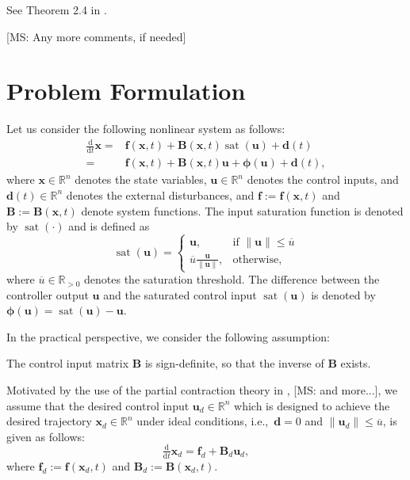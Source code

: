 \documentclass{ifacconf}
\newcommand{\MSRY}[1]{{\color{Peach} [MS: #1]}} %
\newcommand\ie{\textrm{i.e.,\ }}
\newcommand{\ctxt}[2]{{\color{#1}{#2}\color{black}}}
\newcommand{\cred}[1]{{\ctxt{awesome}{#1}}}
\newcommand\R{\mathbb{R}}
\newcommand*{\mv}[1]{\boldsymbol{#1}} %
\newcommand*{\mm}[1]{\boldsymbol{#1}} %
\newcommand*{\norm}[1]{\lVert #1 \rVert} %
\DeclareMathOperator{\mysat}{{sat}}       %
\newcommand\der{\mathrm d}
\newcommand*{\ddtt}{
   \tfrac{\der}{\der t}
}
\begin{document}
\begin{pf}
   See Theorem 2.4 in \cite{Tsukamoto:2021aa}.
\end{pf}


\MSRY{Any more comments, if needed}

\section{Problem Formulation}

Let us consider the following nonlinear system as follows:
\begin{equation} \label{eq:sys}
   \begin{aligned}   
      \ddtt{\mv{x}}
      =&
      \mv{f}(\mv{x},t)
      +
      \mm{B}(\mv{x},t)
      \mysat(\mv{u})   
      +
      \mv{d}(t)
      \\
      =&
      \mv{f}(\mv{x},t)
      +
      \mm{B}(\mv{x},t)
      \mv{u}
      +
      \mv{\phi(\mv{u})}
      +
      \mv{d}(t)
      ,
   \end{aligned}
\end{equation}
where $\mv{x}\in\R^n$ denotes the state variables, $\mv{u}\in\R^n$ denotes the control inputs, and $\mv{d}(t)\in\R^n$ denotes the external disturbances, and $\mv{f}:=\mv{f}(\mv{x},t)$ and $\mm{B}:=\mm{B}(\mv{x},t)$ denote system functions.
The input saturation function is denoted by $\mysat(\cdot)$ and is defined as
\begin{equation} \label{eq:sys:sat}
   \mysat(\mv{u}) =
   \begin{cases}
      \mv{u}, & \text{if } \norm{\mv{u}} \le \overline{u} \\
      \overline{u}\tfrac{\mv{u}}{\norm{\mv{u}}}, & \text{otherwise}
      ,
   \end{cases}
\end{equation}
where $\overline{u}\in\R_{>0}$ denotes the saturation threshold.
The difference between the controller output $\mv{u}$ and the saturated control input $\mysat(\mv{u})$ is denoted by $\mv{\phi}(\mv{u}) = \mysat(\mv{u}) - \mv{u}$.

In the practical perspective, we consider the following assumption:
\begin{assum}
   \cred{수도인버스로변경}The control input matrix $\mv{B}$ is sign-definite, so that the inverse of $\mm{B}$ exists.
\end{assum}

Motivated by the use of the partial contraction theory in \cite{Tsukamoto:2021af}, \MSRY{and more...}, we assume that the desired control input $\mv{u}_d\in\R^n$ which is designed to achieve the desired trajectory $\mv{x}_d\in\R^n$ under ideal conditions, \ie $\mv{d}=0$ and $\norm{\mv{u}_d}\le\overline{u}$, is given as follows:
\begin{equation} \label{eq:sys:desired}
   \ddtt\mv{x}_d   =
   \mv{f}_d
   +
   \mm{B}_d \mv{u}_d
   ,
\end{equation}
where $\mv{f}_d:=\mv{f}(\mv{x}_d, t)$ and $\mm{B}_d:=\mm{B}(\mv{x}_d,t)$.
\end{document}
